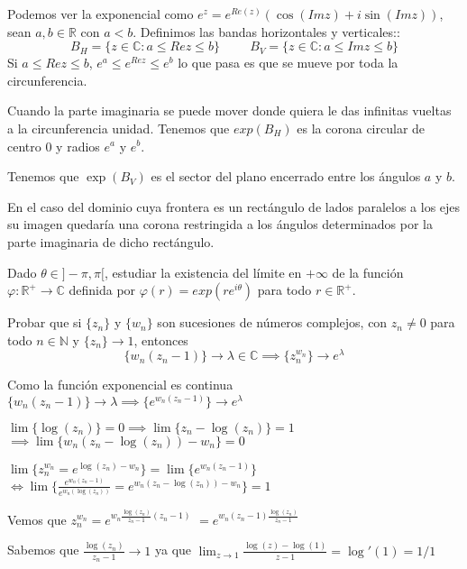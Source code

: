 \begin{sol}

Podemos ver la exponencial como $e^z = e^{Re(z)} (\cos(Imz) + i\sin(Imz))$, sean $a,b\in\mathbb{R}$ con $a<b$.
Definimos las bandas horizontales y verticales::
$$B_H = \{ z\in\mathbb{C} : a\leq Rez \leq b \} \hspace{1cm} B_V = \{ z\in\mathbb{C} : a\leq Imz \leq b \}$$
Si $a\leq Rez \leq b$, $e^a \leq e^{Rez} \leq e^b$
lo que pasa es que se mueve por toda la circunferencia.%

Cuando la parte imaginaria se puede mover donde quiera le das infinitas vueltas a la circunferencia unidad. Tenemos que
$exp(B_H)$ es la corona circular de centro $0$ y radios $e^a$ y $e^b$.

Tenemos que $\exp(B_V)$ es el sector del plano encerrado entre los ángulos $a$ y $b$.

En el caso del dominio cuya frontera es un rectángulo de lados paralelos a los ejes su imagen quedaría una corona restringida a los ángulos determinados por la parte imaginaria de dicho rectángulo.


\end{sol}


\begin{ejer}
	Dado $\theta\in]-\pi,\pi[$, estudiar la existencia del límite en $+\infty$ de la función $\varphi : \mathbb{R}^+\rightarrow\mathbb{C}$ definida por $\varphi(r) = exp(re^{i\theta})$ para todo $r\in\mathbb{R}^+$.
\end{ejer}



\begin{ejer}
Probar que si $\{z_n\}$ y $\{w_n\}$ son sucesiones de números complejos, con $z_n \not = 0$ para todo
$n\in \mathbb{N}$ y $\{ z_n \} \rightarrow 1$, entonces
$$ \{w_n(z_n-1)\} \rightarrow \lambda\in\mathbb{C} \implies \{ z_n^{w_n} \}\rightarrow e^{\lambda} $$
\end{ejer}

\begin{sol}

Como la función exponencial es continua
$\{ w_n (z_n-1) \} \rightarrow \lambda \implies \{ e^{w_n(z_n-1)} \} \rightarrow e^{\lambda}$

$\lim \{ \log(z_n) \} = 0 \implies \lim \{ z_n-\log(z_n) \} = 1$
$\implies \lim \{ w_n(z_n-\log(z_n))-w_n \} = 0$

$\lim \{ z_n^{w_n} = e^{\log(z_n)-w_n} \}= \lim \{ e^{w_n (z_n-1)} \}$
$\Longleftrightarrow \lim\{ \frac{e^{w_n(z_n-1)}}{e^{w_n (\log(z_n))}} = e^{w_n (z_n-\log(z_n))-w_n} \} = 1$

Vemos que
$z_n^{w_n} = e^{w_n \frac{\log(z_n)}{z_n-1} (z_n-1)}$
$= e^{w_n (z_n-1) \frac{\log(z_n)}{z_n-1}}$

Sabemos que $ \frac{\log(z_n)}{z_n-1} \rightarrow 1$ ya que
$\lim_{z\rightarrow 1} \frac{\log(z)-\log(1)}{z-1} = \log'(1) = 1/1$

\end{sol}




